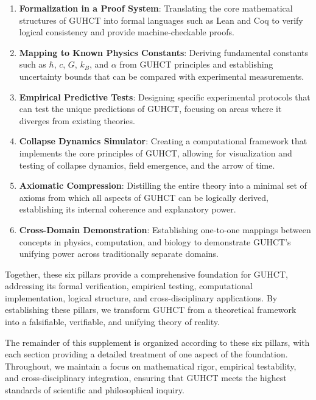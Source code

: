 \documentclass[11pt,a4paper]{article}
\begin{document}
\begin{enumerate}
    \item \textbf{Formalization in a Proof System}: Translating the core mathematical structures of GUHCT into formal languages such as Lean and Coq to verify logical consistency and provide machine-checkable proofs.
    
    \item \textbf{Mapping to Known Physics Constants}: Deriving fundamental constants such as $\hbar$, $c$, $G$, $k_B$, and $\alpha$ from GUHCT principles and establishing uncertainty bounds that can be compared with experimental measurements.
    
    \item \textbf{Empirical Predictive Tests}: Designing specific experimental protocols that can test the unique predictions of GUHCT, focusing on areas where it diverges from existing theories.
    
    \item \textbf{Collapse Dynamics Simulator}: Creating a computational framework that implements the core principles of GUHCT, allowing for visualization and testing of collapse dynamics, field emergence, and the arrow of time.
    
    \item \textbf{Axiomatic Compression}: Distilling the entire theory into a minimal set of axioms from which all aspects of GUHCT can be logically derived, establishing its internal coherence and explanatory power.
    
    \item \textbf{Cross-Domain Demonstration}: Establishing one-to-one mappings between concepts in physics, computation, and biology to demonstrate GUHCT's unifying power across traditionally separate domains.
\end{enumerate}

Together, these six pillars provide a comprehensive foundation for GUHCT, addressing its formal verification, empirical testing, computational implementation, logical structure, and cross-disciplinary applications. By establishing these pillars, we transform GUHCT from a theoretical framework into a falsifiable, verifiable, and unifying theory of reality.

The remainder of this supplement is organized according to these six pillars, with each section providing a detailed treatment of one aspect of the foundation. Throughout, we maintain a focus on mathematical rigor, empirical testability, and cross-disciplinary integration, ensuring that GUHCT meets the highest standards of scientific and philosophical inquiry.
\end{document}
